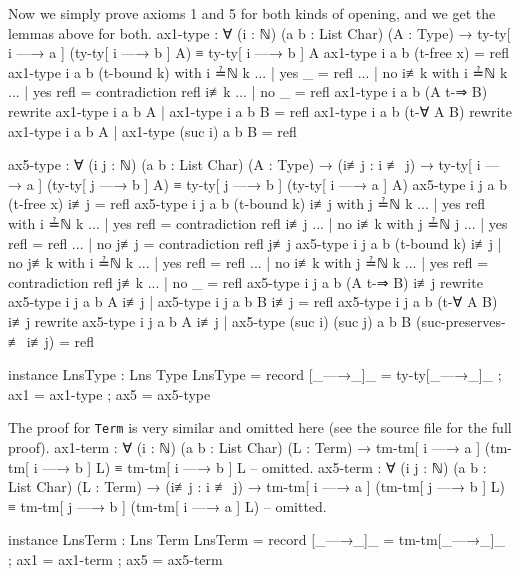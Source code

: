 \documentclass[logo,bsc,singlespacing,parskip,online]{infthesis}
\renewenvironment{code}{\mintedcopy[breaklines,breaksymbolleft=\;]{agda}}{\endmintedcopy}
\begin{document}
Now we simply prove axioms 1 and 5 for both kinds of opening, and we get the lemmas above for both.
\begin{code}
  ax1-type : ∀ (i : ℕ) (a b : List Char) (A : Type)
    → ty-ty[ i —→ a ] (ty-ty[ i —→ b ] A) ≡ ty-ty[ i —→ b ] A
  ax1-type i a b (t-free x) = refl
  ax1-type i a b (t-bound k) with i ≟ℕ k
  ... | yes _   = refl
  ... | no  i≢k with i ≟ℕ k
  ... | yes refl = contradiction refl i≢k
  ... | no  _    = refl
  ax1-type i a b (A t-⇒ B)
    rewrite ax1-type i a b A | ax1-type i a b B = refl
  ax1-type i a b (t-∀ A B)
    rewrite ax1-type i a b A | ax1-type (suc i) a b B = refl

  ax5-type : ∀ (i j : ℕ) (a b : List Char) (A : Type)
    → (i≢j : i ≢ j)
    → ty-ty[ i —→ a ] (ty-ty[ j —→ b ] A)
      ≡ ty-ty[ j —→ b ] (ty-ty[ i —→ a ] A)
  ax5-type i j a b (t-free x) i≢j = refl
  ax5-type i j a b (t-bound k) i≢j with j ≟ℕ k
  ... | yes refl with i ≟ℕ k
  ... |   yes refl = contradiction refl i≢j
  ... |   no  i≢k  with j ≟ℕ j
  ... |     yes refl = refl
  ... |     no  j≢j  = contradiction refl j≢j
  ax5-type i j a b (t-bound k) i≢j | no j≢k with i ≟ℕ k
  ... | yes refl = refl
  ... | no  i≢k  with j ≟ℕ k
  ... |   yes refl = contradiction refl j≢k
  ... |   no  _    = refl
  ax5-type i j a b (A t-⇒ B) i≢j
    rewrite ax5-type i j a b A i≢j | ax5-type i j a b B i≢j = refl
  ax5-type i j a b (t-∀ A B) i≢j
    rewrite ax5-type i j a b A i≢j
      | ax5-type (suc i) (suc j) a b B (suc-preserves-≢ i≢j)
          = refl
  
  instance
    LnsType : Lns Type
    LnsType = record
      { [_—→_]_ = ty-ty[_—→_]_
      ; ax1 = ax1-type
      ; ax5 = ax5-type }
\end{code}

The proof for \texttt{Term} is very similar and omitted here (see the source file for the full proof).
\begin{code}
  ax1-term : ∀ (i : ℕ) (a b : List Char) (L : Term)
    → tm-tm[ i —→ a ] (tm-tm[ i —→ b ] L) ≡ tm-tm[ i —→ b ] L
  -- omitted.
  ax5-term : ∀ (i j : ℕ) (a b : List Char) (L : Term)
    → (i≢j : i ≢ j)
    → tm-tm[ i —→ a ] (tm-tm[ j —→ b ] L)
        ≡ tm-tm[ j —→ b ] (tm-tm[ i —→ a ] L)
  -- omitted.

  instance
    LnsTerm : Lns Term
    LnsTerm = record
      { [_—→_]_ = tm-tm[_—→_]_
      ; ax1 = ax1-term
      ; ax5 = ax5-term }
\end{code}
\end{document}
